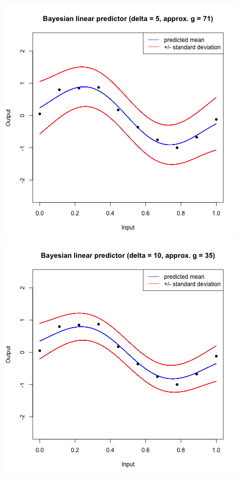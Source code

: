 \documentclass[a4paper, 11pt]{article}
\begin{document}
\begin{center}
\includegraphics[scale=0.6]{ps3F_plot7.png}
\includegraphics[scale=0.6]{ps3F_plot8.png}

\end{center}
\end{document}
